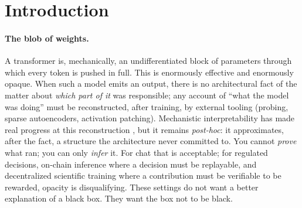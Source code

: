 \documentclass[11pt]{article}
\begin{document}
\begin{abstract}
2.97--2.99) and surviving a harder prose+code+textbook corpus. At equal parameters, data, and
training budget, attaining lower loss is a parameter- and compute-efficiency advantage---the same
capability is reachable with less of both---which is what we mean when we say partitioning lets a
model \emph{learn more per parameter} than its dense twin; we measure capability per parameter, not
wall-clock, and keep that distinction explicit. A learned router generalizes to held-out prompts
(separation 3.10 vs.\ 2.63). \textbf{Decentralizability} is specified, formally modeled, and now
partially scaffolded---a signed, verify-before-compose zone gather---with the multi-node training
cycle still future work: composable named zones reconciled via paraconsistent (Belnap) aggregation
on a verifiable chain. All empirical results are at small scale ($\le$2M parameters, byte- and
subword-level), without a mixture-of-experts baseline or component ablation, and we are explicit
that a larger, better-controlled run could flatten or reverse the trend. NAT is
implemented as a reproducible Rust workspace; a GGUF/ONNX sidecar design targets ecosystem
compatibility. We position NAT as the model layer for a verifiable, federated learning network in
which \emph{consensus and learning are the same process}, and contributors are rewarded as
$\mathrm{compute}\times\mathrm{data\text{-}quality}$.
\end{abstract}

\section{Introduction}

\paragraph{The blob of weights.}
A transformer \citep{vaswani2017attention} is, mechanically, an undifferentiated block of parameters
through which every token is pushed in full. This is enormously effective and enormously opaque. When such a model emits an
output, there is no architectural fact of the matter about \emph{which part of it} was responsible;
any account of ``what the model was doing'' must be reconstructed, after training, by external
tooling (probing, sparse autoencoders, activation patching). Mechanistic interpretability has made
real progress at this reconstruction \citep{rai2024practical,bereska2024mechanistic}, but it remains
\emph{post-hoc}: it approximates, after the fact, a structure the architecture never committed to.
You cannot \emph{prove} what ran; you can only \emph{infer} it. For chat that is acceptable; for
regulated decisions, on-chain inference where a decision must be replayable, and decentralized
scientific training where a contribution must be verifiable to be rewarded, opacity is
disqualifying. These settings do not want a better explanation of a black box. They want the box not
to be black.
\end{document}
